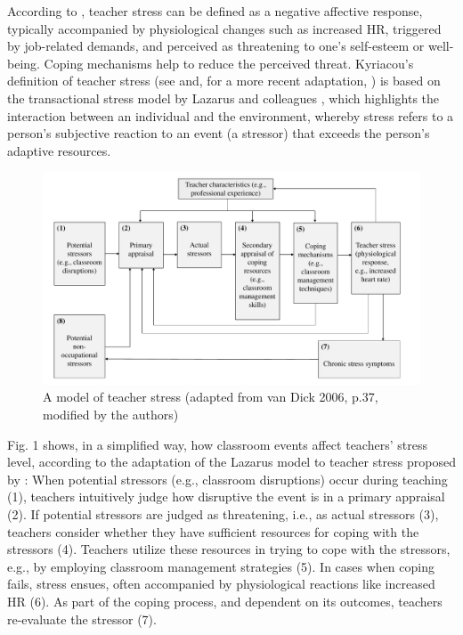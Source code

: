 \documentclass[preprint, 3p,
authoryear]{elsarticle} %
\begin{document}
According to \citet{kyriacou1978}, teacher stress can be defined as a
negative affective response, typically accompanied by physiological
changes such as increased HR, triggered by job-related demands, and
perceived as threatening to one's self-esteem or well-being. Coping
mechanisms help to reduce the perceived threat. Kyriacou's definition of
teacher stress (see \citet{kyriacou1978} and, for a more recent
adaptation, \citet{van2006stress}) is based on the transactional stress
model by Lazarus and colleagues
\citep{lazarus1966psychological, lazarus1990theory}, which highlights
the interaction between an individual and the environment, whereby
stress refers to a person's subjective reaction to an event (a stressor)
that exceeds the person's adaptive resources.

\begin{figure}[htbp]
  \centering
  \includegraphics[width=1\textwidth]{images/Model_Teacher_Stress_adapted_new.pdf}
  \caption{A model of teacher stress (adapted from van Dick 2006, p.37, modified by the authors)}
  \label{A model of teacher stress (adapted from van Dick 2006, p.37, modified by the authors)}
\end{figure}

Fig. 1 shows, in a simplified way, how classroom events affect teachers'
stress level, according to the adaptation of the Lazarus model to
teacher stress proposed by \citet{van2006stress}: When potential
stressors (e.g., classroom disruptions) occur during teaching (1),
teachers intuitively judge how disruptive the event is in a primary
appraisal (2). If potential stressors are judged as threatening, i.e.,
as actual stressors (3), teachers consider whether they have sufficient
resources for coping with the stressors (4). Teachers utilize these
resources in trying to cope with the stressors, e.g., by employing
classroom management strategies (5). In cases when coping fails, stress
ensues, often accompanied by physiological reactions like increased HR
(6). As part of the coping process, and dependent on its outcomes,
teachers re-evaluate the stressor (7).
\end{document}
